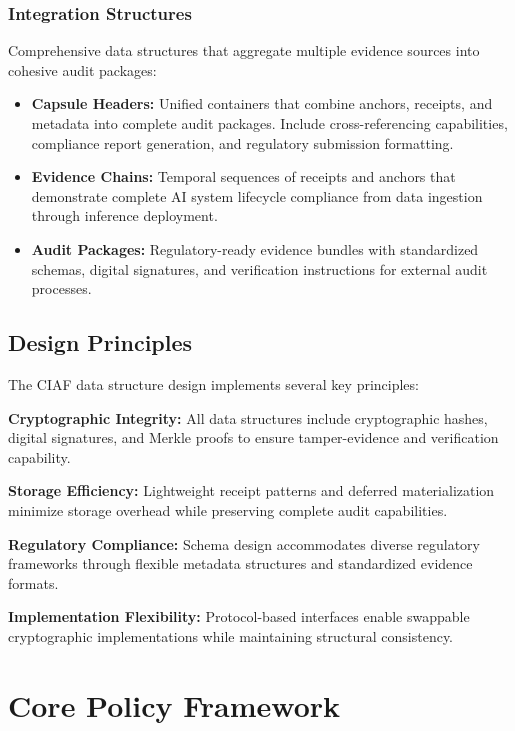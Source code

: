 \documentclass[12pt,a4paper]{article}
\begin{document}
\subsubsection{Integration Structures}

Comprehensive data structures that aggregate multiple evidence sources into cohesive audit packages:

\begin{itemize}
    \item \textbf{Capsule Headers:} Unified containers that combine anchors, receipts, and metadata into complete audit packages. Include cross-referencing capabilities, compliance report generation, and regulatory submission formatting.
    
    \item \textbf{Evidence Chains:} Temporal sequences of receipts and anchors that demonstrate complete AI system lifecycle compliance from data ingestion through inference deployment.
    
    \item \textbf{Audit Packages:} Regulatory-ready evidence bundles with standardized schemas, digital signatures, and verification instructions for external audit processes.
\end{itemize}

\subsection{Design Principles}

The CIAF data structure design implements several key principles:

\textbf{Cryptographic Integrity:} All data structures include cryptographic hashes, digital signatures, and Merkle proofs to ensure tamper-evidence and verification capability.

\textbf{Storage Efficiency:} Lightweight receipt patterns and deferred materialization minimize storage overhead while preserving complete audit capabilities.

\textbf{Regulatory Compliance:} Schema design accommodates diverse regulatory frameworks through flexible metadata structures and standardized evidence formats.

\textbf{Implementation Flexibility:} Protocol-based interfaces enable swappable cryptographic implementations while maintaining structural consistency.

\section{Core Policy Framework}
\end{document}
